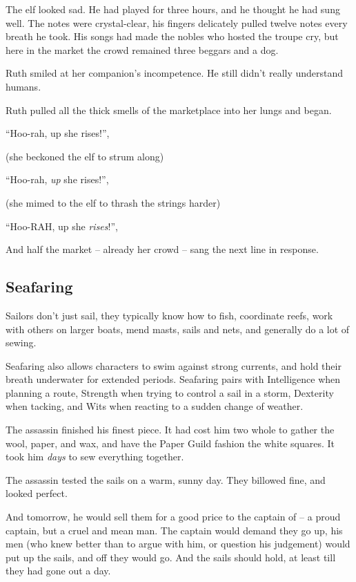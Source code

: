 \begin{multicols}{2}
\begin{exampletext}
  The elf looked sad.
  He had played for three hours, and he thought he had sung well.
  The notes were crystal-clear, his fingers delicately pulled twelve notes every breath he took.
  His songs had made the nobles who hosted the troupe cry, but here in the market the crowd remained three beggars and a dog.

  Ruth smiled at her companion's incompetence.
  He still didn't really understand humans.

  Ruth pulled all the thick smells of the marketplace into her lungs and began.

  ``Hoo-rah, up she rises!'',

  (she beckoned the elf to strum along)

  ``Hoo-rah, \emph{up} she rises!'',

  (she mimed to the elf to thrash the strings harder)

  ``Hoo-RAH, up she \emph{rises}!'',

  And half the market -- already her crowd -- sang the next line in response.

\end{exampletext}

\subsection{Seafaring}

Sailors don't just sail, they typically know how to fish, coordinate reefs, work with others on larger boats, mend masts, sails and nets, and generally do a lot of sewing.

Seafaring also allows characters to swim against strong currents, and hold their breath underwater for extended periods.
Seafaring pairs with Intelligence when planning a route, Strength when trying to control a sail in a storm, Dexterity when tacking, and Wits when reacting to a sudden change of weather.

\begin{exampletext}
  The assassin finished his finest piece.
  It had cost him two whole  to gather the wool, paper, and wax, and have the Paper Guild fashion the white squares.
  It took him \emph{days} to sew everything together.

  The assassin tested the sails on a warm, sunny day.
  They billowed fine, and looked perfect.

  And tomorrow, he would sell them for a good price to the captain of \iftoggle{aif}{\gls{king}'s Pride}{the Black Seal} -- a proud captain, but a cruel and mean man.
  The captain would demand they go up, his men (who knew better than to argue with him, or question his judgement) would put up the sails, and off they would go.
  And the sails should hold, at least till they had gone out a day.


\end{exampletext}
\end{multicols}

